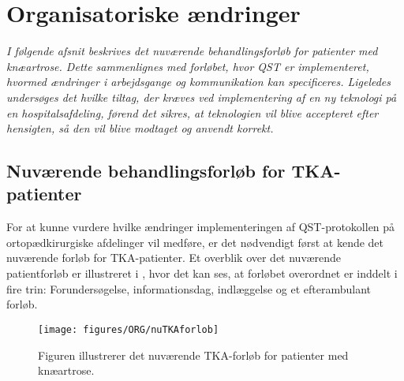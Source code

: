 \section{Organisatoriske ændringer}
\textit{I følgende afsnit beskrives det nuværende behandlingsforløb for patienter med knæartrose. Dette sammenlignes med forløbet, hvor QST er implementeret, hvormed ændringer i arbejdsgange og kommunikation kan specificeres. Ligeledes undersøges det hvilke tiltag, der kræves ved implementering af en ny teknologi på en hospitalsafdeling, førend det sikres, at teknologien vil blive accepteret efter hensigten, så den vil blive modtaget og anvendt korrekt.}


\subsection{Nuværende behandlingsforløb for TKA-patienter}
For at kunne vurdere hvilke ændringer implementeringen af QST-protokollen på ortopædkirurgiske afdelinger vil medføre, er det nødvendigt først at kende det nuværende forløb for TKA-patienter. Et overblik over det nuværende patientforløb er illustreret i , hvor det kan ses, at forløbet overordnet er inddelt i fire trin: Forundersøgelse, informationsdag, indlæggelse og et efterambulant forløb. 


\begin{figure}[H] 
	\begin{center}
		\texttt{[image: figures/ORG/nuTKAforlob]}
	\end{center}
	\caption{Figuren illustrerer det nuværende TKA-forløb for patienter med knæartrose.} 
	\label{nuTKAforlob} 
\end{figure} \vspace{-.25cm}



